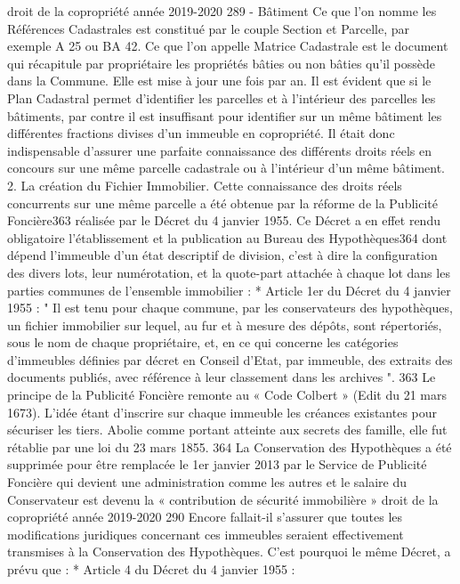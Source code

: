 		droit de la copropriété année 2019-2020
		289
		- Bâtiment
		Ce que l'on nomme les Références Cadastrales est constitué par le couple Section et Parcelle, par exemple A 25 ou BA 42.
		Ce que l'on appelle Matrice Cadastrale est le document qui récapitule par propriétaire les propriétés bâties ou non bâties qu'il possède dans la Commune. Elle est mise à jour une fois par an.
		Il est évident que si le Plan Cadastral permet d'identifier les parcelles et à l'intérieur des parcelles les bâtiments, par contre il est insuffisant pour identifier sur un même bâtiment les différentes fractions divises d'un immeuble en copropriété.
		Il était donc indispensable d'assurer une parfaite connaissance des différents droits réels en concours sur une même parcelle cadastrale ou à l'intérieur d'un même bâtiment.
		2. La création du Fichier Immobilier.
		Cette connaissance des droits réels concurrents sur une même parcelle a été obtenue par la réforme de la Publicité Foncière363 réalisée par le Décret du 4 janvier 1955.
		Ce Décret a en effet rendu obligatoire l'établissement et la publication au Bureau des Hypothèques364 dont dépend l’immeuble d’un état descriptif de division, c'est à dire la configuration des divers lots, leur numérotation, et la quote-part attachée à chaque lot dans les parties communes de l'ensemble immobilier :
		* Article 1er du Décret du 4 janvier 1955 :
		" Il est tenu pour chaque commune, par les conservateurs des hypothèques, un fichier immobilier sur lequel, au fur et à mesure des dépôts, sont répertoriés, sous le nom de chaque propriétaire, et, en ce qui concerne les catégories d'immeubles définies par décret en Conseil d'Etat, par immeuble, des extraits des documents publiés, avec référence à leur classement dans les archives ".
		363 Le principe de la Publicité Foncière remonte au « Code Colbert » (Edit du 21 mars 1673). L’idée étant d’inscrire sur chaque immeuble les créances existantes pour sécuriser les tiers. Abolie comme portant atteinte aux secrets des famille, elle fut rétablie par une loi du 23 mars 1855.
		364 La Conservation des Hypothèques a été supprimée pour être remplacée le 1er janvier 2013 par le Service de Publicité Foncière qui devient une administration comme les autres et le salaire du Conservateur est devenu la « contribution de sécurité immobilière »
		droit de la copropriété année 2019-2020
		290
		Encore fallait-il s'assurer que toutes les modifications juridiques concernant ces immeubles seraient effectivement transmises à la Conservation des Hypothèques.
		C'est pourquoi le même Décret, a prévu que :
		* Article 4 du Décret du 4 janvier 1955 :
